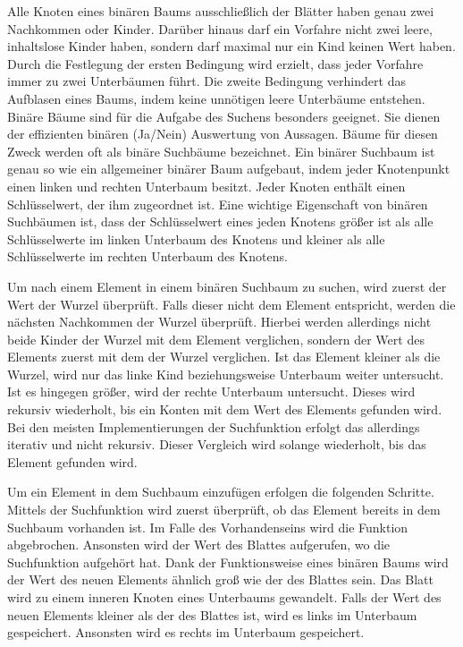 Alle Knoten eines binären Baums ausschließlich der Blätter haben genau zwei Nachkommen oder Kinder. Darüber hinaus darf ein Vorfahre nicht zwei leere, inhaltslose Kinder haben, sondern darf maximal nur ein Kind keinen Wert haben. Durch die Festlegung der ersten Bedingung wird erzielt, dass jeder Vorfahre immer zu zwei Unterbäumen führt. Die zweite Bedingung verhindert das Aufblasen eines Baums, indem keine unnötigen leere Unterbäume entstehen. Binäre Bäume sind für die Aufgabe des Suchens besonders geeignet. Sie dienen der effizienten binären (Ja/Nein) Auswertung von Aussagen. Bäume für diesen Zweck werden oft als binäre Suchbäume bezeichnet. Ein binärer Suchbaum ist genau so wie ein allgemeiner binärer Baum aufgebaut, indem jeder Knotenpunkt einen linken und rechten Unterbaum besitzt. Jeder Knoten enthält einen Schlüsselwert, der ihm zugeordnet ist. Eine wichtige Eigenschaft von binären Suchbäumen ist, dass der Schlüsselwert eines jeden Knotens größer ist als alle Schlüsselwerte im linken Unterbaum des Knotens und kleiner als alle Schlüsselwerte im rechten Unterbaum des Knotens. \autocite[94-95]{ollmert_datenstrukturen_2020}

Um nach einem Element in einem binären Suchbaum zu suchen, wird zuerst der Wert der Wurzel überprüft. Falls dieser nicht dem Element entspricht, werden die nächsten Nachkommen der Wurzel überprüft. Hierbei werden allerdings nicht beide Kinder der Wurzel mit dem Element verglichen, sondern der Wert des Elements zuerst mit dem der Wurzel verglichen. Ist das Element kleiner als die Wurzel, wird nur das linke Kind beziehungsweise Unterbaum weiter untersucht. Ist es hingegen größer, wird der rechte Unterbaum untersucht. Dieses wird rekursiv wiederholt, bis ein Konten mit dem Wert des Elements gefunden wird. Bei den meisten Implementierungen der Suchfunktion erfolgt das allerdings iterativ und nicht rekursiv. Dieser Vergleich wird solange wiederholt, bis das Element gefunden wird. \autocite[139-140]{knebl_algorithmen_2021}

Um ein Element in dem Suchbaum einzufügen erfolgen die folgenden Schritte. Mittels der Suchfunktion wird zuerst überprüft, ob das Element bereits in dem Suchbaum vorhanden ist. Im Falle des Vorhandenseins wird die Funktion abgebrochen. Ansonsten wird der Wert des Blattes aufgerufen, wo die Suchfunktion aufgehört hat. Dank der Funktionsweise eines binären Baums wird der Wert des neuen Elements ähnlich groß wie der des Blattes sein. Das Blatt wird zu einem inneren Knoten eines Unterbaums gewandelt. Falls der Wert des neuen Elements kleiner als der des Blattes ist, wird es links im Unterbaum gespeichert. Ansonsten wird es rechts im Unterbaum gespeichert. \autocite[140]{knebl_algorithmen_2021}

